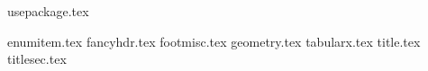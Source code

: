 {usepackage.tex}


{enumitem.tex}
{fancyhdr.tex}
{footmisc.tex}
{geometry.tex}
{tabularx.tex}
{title.tex}
{titlesec.tex}